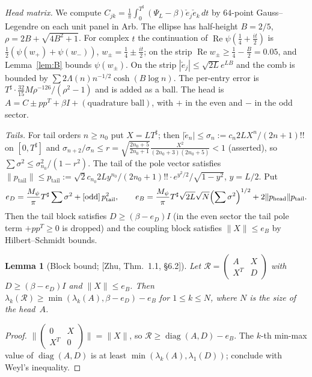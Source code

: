 \documentclass[11pt]{amsart}
\newcommand{\od}{\mathrm{odd}}
\newcommand{\re}{\operatorname{Re}}
\newcommand{\Tsh}{T^{\sharp}}
\newtheorem{lemma}[theorem]{Lemma}
\theoremstyle{definition}
\theoremstyle{remark}
\numberwithin{equation}{section}
\begin{document}
\emph{Head matrix.} We compute $C_{jk}=\frac1\pi\int_0^{\Tsh}(\Psi_L-\beta)\check e_j\check e_k\,dt$ by $64$-point Gauss--Legendre on each unit panel in Arb. The ellipse has half-height $B=2/5$, $\rho=2B+\sqrt{4B^2+1}$. For complex $t$ the continuation of $\re\psi(\tfrac14+\tfrac{it}2)$ is $\tfrac12(\psi(w_+)+\psi(w_-))$, $w_\pm=\tfrac14\pm\tfrac{it}2$; on the strip $\re w_\pm\ge\tfrac14-\tfrac B2=0.05$, and Lemma~\ref{lem:B} bounds $\psi(w_\pm)$. On the strip $|\check e_j|\le\sqrt{2L}e^{LB}$ and the comb is bounded by $\sum2\Lambda(n)n^{-1/2}\cosh(B\log n)$. The per-entry error is $\Tsh\cdot\frac{32}{15}M\rho^{-126}/(\rho^2-1)$ and is added as a ball. The head is $A=C\pm pp^T+\beta I+(\text{quadrature ball})$, with $+$ in the even and $-$ in the odd sector.

\emph{Tails.} For tail orders $n\ge n_0$ put $X=L\Tsh$; then $|\check e_n|\le\sigma_n:=c_n2LX^n/(2n+1)!!$ on $[0,\Tsh]$ and $\sigma_{n+2}/\sigma_n\le r=\sqrt{\frac{2n_0+5}{2n_0+1}}\frac{X^2}{(2n_0+3)(2n_0+5)}<1$ (asserted), so $\sum\sigma^2\le\sigma_{n_0}^2/(1-r^2)$. The tail of the pole vector satisfies $\|p_{\mathrm{tail}}\|\le p_{\mathrm{tail}}:=\sqrt2c_{n_0}2Ly^{n_0}/(2n_0+1)!!\cdot e^{y^2/2}/\sqrt{1-y^2}$, $y=L/2$. Put
\[
e_D=\frac{M_\psi}\pi\Tsh\sum\sigma^2+[\od]\,p_{\mathrm{tail}}^2,\qquad
e_B=\frac{M_\psi}\pi\Tsh\sqrt{2L}\sqrt N\Bigl(\sum\sigma^2\Bigr)^{1/2}+2\|p_{\mathrm{head}}\|p_{\mathrm{tail}}.
\]
Then the tail block satisfies $D\ge(\beta-e_D)I$ (in the even sector the tail pole term $+pp^T\ge0$ is dropped) and the coupling block satisfies $\|X\|\le e_B$ by Hilbert--Schmidt bounds.

\begin{lemma}[Block bound; {[Zhu, Thm.~1.1, \S6.2]}]\label{lem:S}
Let $\mathcal R=\begin{pmatrix}A&X\\X^T&D\end{pmatrix}$ with $D\ge(\beta-e_D)I$ and $\|X\|\le e_B$. Then $\lambda_k(\mathcal R)\ge\min(\lambda_k(A),\beta-e_D)-e_B$ for $1\le k\le N$, where $N$ is the size of the head~$A$.
\end{lemma}
\begin{proof}
$\bigl\|\begin{pmatrix}0&X\\X^T&0\end{pmatrix}\bigr\|=\|X\|$, so $\mathcal R\ge\operatorname{diag}(A,D)-e_B$. The $k$-th min-max value of $\operatorname{diag}(A,D)$ is at least $\min(\lambda_k(A),\lambda_1(D))$; conclude with Weyl's inequality.
\end{proof}
\end{document}
